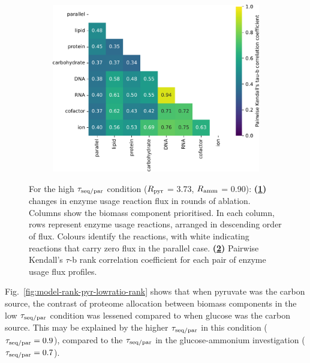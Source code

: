 \begin{figure}[htbp!]
\begin{subfigure}[t]{0.45\textwidth}
    \caption{
    }
    \label{fig:model-rank-pyr-highratio-rank}
  \end{subfigure}%
  \begin{subfigure}[t]{0.45\textwidth}
  \centering
    \includegraphics[width=\linewidth]{CompareEnzUse_glc00p00_pyr03p73_amm00p90_2.pdf}
    \caption{
    }
    \label{fig:model-rank-pyr-highratio-kendall}
  \end{subfigure}

  \caption[
    Changes in enzyme usage reaction flux and Kendall's $\tau$-b rank correlation coefficient for each pair, $\exchrate{pyr}$ = \SI{3.73}{\mmolgdwh}, $\exchrate{amm}$ = \SI{0.90}{\mmolgdwh}.
  ]{
    For the high $\tau_{\mathrm{seq}/\mathrm{par}}$ condition ($\exchrate{pyr}$ = \SI{3.73}{\mmolgdwh}, $\exchrate{amm}$ = \SI{0.90}{\mmolgdwh}):
    \textbf{(\ref{fig:model-rank-pyr-highratio-rank})}
    changes in enzyme usage reaction flux in rounds of ablation.
    Columns show the biomass component prioritised.
    In each column, rows represent enzyme usage reactions, arranged in descending order of flux.
    Colours identify the reactions, with white indicating reactions that carry zero flux in the parallel case.
    \textbf{(\ref{fig:model-rank-pyr-highratio-kendall})}
    Pairwise Kendall's $\tau$-b rank correlation coefficient \parencite{kendallTREATMENTTIESRANKING1945} for each pair of enzyme usage flux profiles.
  }
  \label{fig:model-rank-pyr-highratio}
\end{figure}

Fig.\ \ref{fig:model-rank-pyr-lowratio-rank} shows that when pyruvate was the carbon source, the contrast of proteome allocation between biomass components in the low $\tau_{\mathrm{seq}/\mathrm{par}}$ condition was lessened compared to when glucose was the carbon source.
This may be explained by the higher $\tau_{\mathrm{seq}/\mathrm{par}}$ in this condition ($\tau_{\mathrm{seq}/\mathrm{par}} = 0.9$), compared to the $\tau_{\mathrm{seq}/\mathrm{par}}$ in the glucose-ammonium investigation ($\tau_{\mathrm{seq}/\mathrm{par}} = 0.7$).

